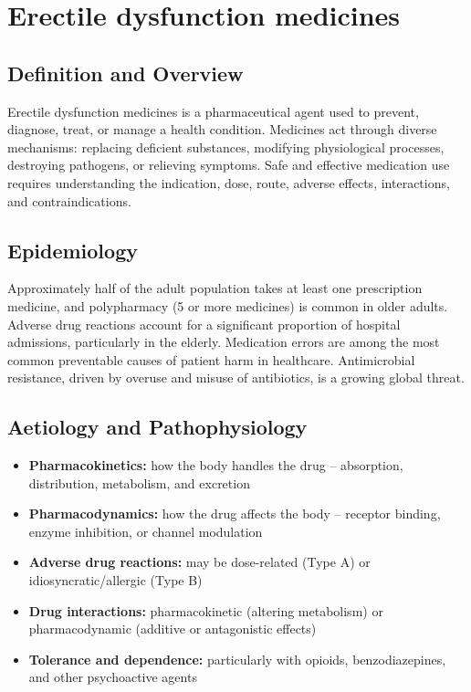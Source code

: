 \chapter{Erectile dysfunction medicines}

\section*{Definition and Overview}
Erectile dysfunction medicines is a pharmaceutical agent used to prevent, diagnose, treat, or manage a health condition. Medicines act through diverse mechanisms: replacing deficient substances, modifying physiological processes, destroying pathogens, or relieving symptoms. Safe and effective medication use requires understanding the indication, dose, route, adverse effects, interactions, and contraindications.

\section*{Epidemiology}
Approximately half of the adult population takes at least one prescription medicine, and polypharmacy (5 or more medicines) is common in older adults. Adverse drug reactions account for a significant proportion of hospital admissions, particularly in the elderly. Medication errors are among the most common preventable causes of patient harm in healthcare. Antimicrobial resistance, driven by overuse and misuse of antibiotics, is a growing global threat.

\section*{Aetiology and Pathophysiology}
\begin{itemize}
    \item \textbf{Pharmacokinetics:} how the body handles the drug -- absorption, distribution, metabolism, and excretion
    \item \textbf{Pharmacodynamics:} how the drug affects the body -- receptor binding, enzyme inhibition, or channel modulation
    \item \textbf{Adverse drug reactions:} may be dose-related (Type A) or idiosyncratic/allergic (Type B)
    \item \textbf{Drug interactions:} pharmacokinetic (altering metabolism) or pharmacodynamic (additive or antagonistic effects)
    \item \textbf{Tolerance and dependence:} particularly with opioids, benzodiazepines, and other psychoactive agents
\end{itemize}

